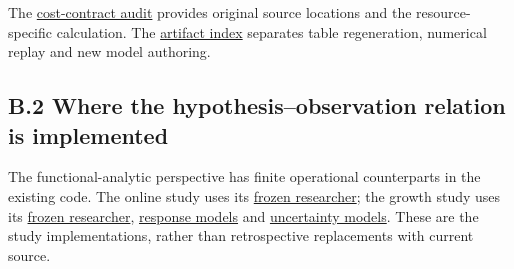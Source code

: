 \documentclass[twoside,11pt]{article}
\begin{document}
The \hyperlink{artifact-44}{cost-contract audit} provides original source locations and the resource-specific calculation. The \hyperlink{artifact-1}{artifact index} separates table regeneration, numerical replay and new model authoring.


\subsection*{B.2 Where the hypothesis–observation relation is implemented}

The functional-analytic perspective has finite operational counterparts in the existing code. The online study uses its \hyperlink{artifact-45}{frozen researcher}; the growth study uses its \hyperlink{artifact-46}{frozen researcher}, \hyperlink{artifact-47}{response models} and \hyperlink{artifact-48}{uncertainty models}. These are the study implementations, rather than retrospective replacements with current source.
\end{document}
